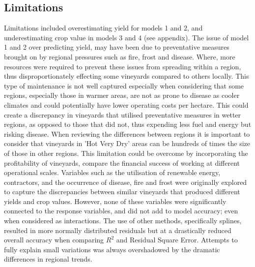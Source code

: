\documentclass[review,12pt,authoryear]{elsarticle}
\begin{document}
\begin{linenumbers}
\subsection{Limitations}
Limitations included overestimating yield for models 1 and 2, and underestimating crop value in models 3 and 4 (see appendix). The issue of model 1 and 2 over predicting yield, may have been due to preventative measures brought on by regional pressures such as fire, frost and disease. Where, more resources were required to prevent these issues from spreading within a region, thus disproportionately effecting some vineyards compared to others locally. This type of maintenance is not well captured especially when considering that some regions, especially those in warmer areas, are not as prone to disease as cooler climates and could potentially have lower operating costs per hectare. This could create a discrepancy in vineyards that utilised preventative measures in wetter regions, as opposed to those that did not, thus expending less fuel and energy but risking disease. When reviewing the differences between regions it is important to consider that vineyards in 'Hot Very Dry' areas can be hundreds of times the size of those in other regions. This limitation could be overcome by incorporating the profitability of vineyards, compare the financial success of working at different operational scales.
\newline
Variables such as the utilisation of renewable energy, contractors, and the occurrence of disease, fire and frost were originally explored to capture the discrepancies between similar vineyards that produced different  yields and crop values. However, none of these variables were significantly connected to the response variables, and did not add to model accuracy; even when considered as interactions. The use of other methods, specifically splines, resulted in more normally distributed residuals but at a drastically reduced overall accuracy when comparing $R^2$ and Residual Square Error. Attempts to fully explain small variations was always overshadowed by the dramatic differences in regional trends.
\newline

\end{linenumbers}
\end{document}
